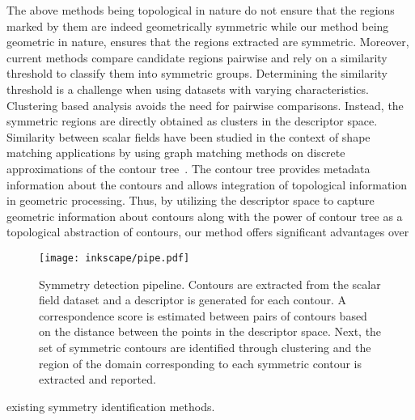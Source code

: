 \documentclass[review,journal]{vgtc}         %
\begin{document}
The above methods being topological in nature do not ensure that the regions marked by
them are indeed geometrically symmetric while our method being geometric in nature, 
ensures that the regions extracted are symmetric. Moreover, current methods compare candidate regions 
pairwise and rely on a similarity threshold to classify them into symmetric groups. Determining
the similarity threshold is a challenge when using datasets with varying characteristics.
Clustering based analysis avoids the need for pairwise comparisons. Instead, the symmetric regions
are directly obtained as clusters in the descriptor space. 
Similarity between scalar fields have been
studied in the context of shape matching applications by using graph matching methods on 
discrete approximations of the contour tree~\cite{ZhangBKDNB06,HilagaSKK01}.
The contour tree provides metadata information about the contours
and allows integration of topological information in geometric processing. Thus, by utilizing 
the descriptor space to capture geometric information about contours along with the power of contour 
tree as a topological abstraction of contours, our method offers significant advantages over 
\begin{figure*}[t]
	\centering
		\texttt{[image: inkscape/pipe.pdf]}
	\caption{\label{pipeline} Symmetry detection pipeline. Contours are extracted
		from the scalar field dataset and a descriptor is generated for each contour.
		A correspondence score is estimated between pairs of contours based on the
		distance between the points in the descriptor space. Next, the set of symmetric
		contours are identified through clustering and the region of the domain corresponding
	to each symmetric contour is extracted and reported.}
\end{figure*}
existing symmetry identification methods. 
\end{document}

